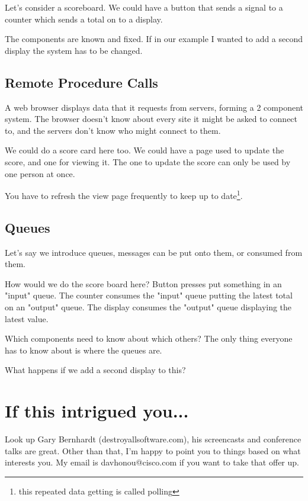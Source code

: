 \documentclass{article}
\begin{document}
Let's consider a scoreboard.
We could have a button that sends a signal to a counter which sends a total on
to a display.

The components are known and fixed.
If in our example I wanted to add a second display the system has to be
changed.

\subsection{Remote Procedure Calls}
A web browser displays data that it requests from servers, forming a 2
component system. The browser doesn't know about every site it might be asked
to connect to, and the servers don't know who might connect to them.

We could do a score card here too.
We could have a page used to update the score, and one for viewing it.
The one to update the score can only be used by one person at once.

You have to refresh the view page frequently to keep up to date\footnote{
this repeated data getting is called polling}.

\subsection{Queues}
Let's say we introduce queues, messages can be put onto them, or consumed from them.

How would we do the score board here?
Button presses put something in an "input" queue.
The counter consumes the "input" queue putting the latest total on an "output" queue.
The display consumes the "output" queue displaying the latest value.

Which components need to know about which others?
The only thing everyone has to know about is where the queues are.

What happens if we add a second display to this?

\section{If this intrigued you...}
Look up Gary Bernhardt (destroyallsoftware.com), his screencasts and conference
talks are great.
Other than that, I'm happy to point you to things based on what interests you.
My email is davhonou@cisco.com if you want to take that offer up.
\end{document}
